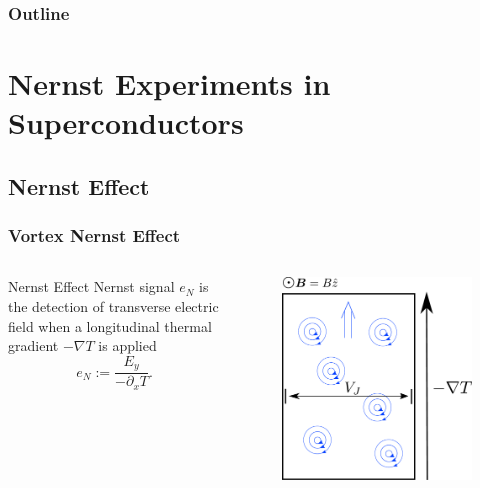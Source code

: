\documentclass[10pt,aspectratio=43,xcolor=x11names,t]{beamer}%
\begin{document}
\begin{frame}
	\frametitle{Outline}
	\tableofcontents
\end{frame}


\section{Nernst Experiments in Superconductors}
	\subsection{Nernst Effect}
		\begin{frame}\frametitle{Vortex Nernst Effect}
			\begin{columns}
				\begin{column}{0.5\textwidth}
					\begin{block}{Nernst Effect}
						Nernst signal $e_N$ is the detection of transverse electric field when a longitudinal thermal gradient $-\nabla T$ is applied
						\begin{equation*}
							e_N:=\dfrac{E_y}{-\partial_x T}.
						\end{equation*}
					\end{block}
				\end{column}
				\begin{column}{0.4\textwidth}
					\begin{figure}[!htp]
						\centering
						\includegraphics[scale=0.3]{vortex.pdf}

\end{figure}
\end{column}
\end{columns}
\end{frame}
\end{document}
